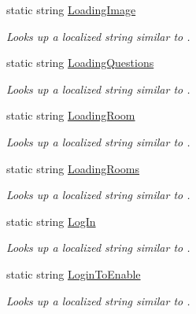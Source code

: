 \begin{DoxyCompactItemize}
static string \hyperlink{class_wis_r_1_1_app___resources_1_1_resource_af20d3339283f2b112f1aa40ce4568ed2}{Loading\+Image}
\begin{DoxyCompactList}\small\item\em Looks up a localized string similar to . \end{DoxyCompactList}\item 
static string \hyperlink{class_wis_r_1_1_app___resources_1_1_resource_a95449f36922bdc6fdc8ef4285917538f}{Loading\+Questions}
\begin{DoxyCompactList}\small\item\em Looks up a localized string similar to . \end{DoxyCompactList}\item 
static string \hyperlink{class_wis_r_1_1_app___resources_1_1_resource_aa17890d1187ed4141f3a825444e22d60}{Loading\+Room}
\begin{DoxyCompactList}\small\item\em Looks up a localized string similar to . \end{DoxyCompactList}\item 
static string \hyperlink{class_wis_r_1_1_app___resources_1_1_resource_a27c802797504c788ba97124cbaf281ef}{Loading\+Rooms}
\begin{DoxyCompactList}\small\item\em Looks up a localized string similar to . \end{DoxyCompactList}\item 
static string \hyperlink{class_wis_r_1_1_app___resources_1_1_resource_a57fdfbe77f61c98a62e24c6013857475}{Log\+In}
\begin{DoxyCompactList}\small\item\em Looks up a localized string similar to . \end{DoxyCompactList}\item 
static string \hyperlink{class_wis_r_1_1_app___resources_1_1_resource_a589a295314b805c77417752870036282}{Login\+To\+Enable}
\begin{DoxyCompactList}\small\item\em Looks up a localized string similar to . \end{DoxyCompactList}\item 

\end{DoxyCompactItemize}
